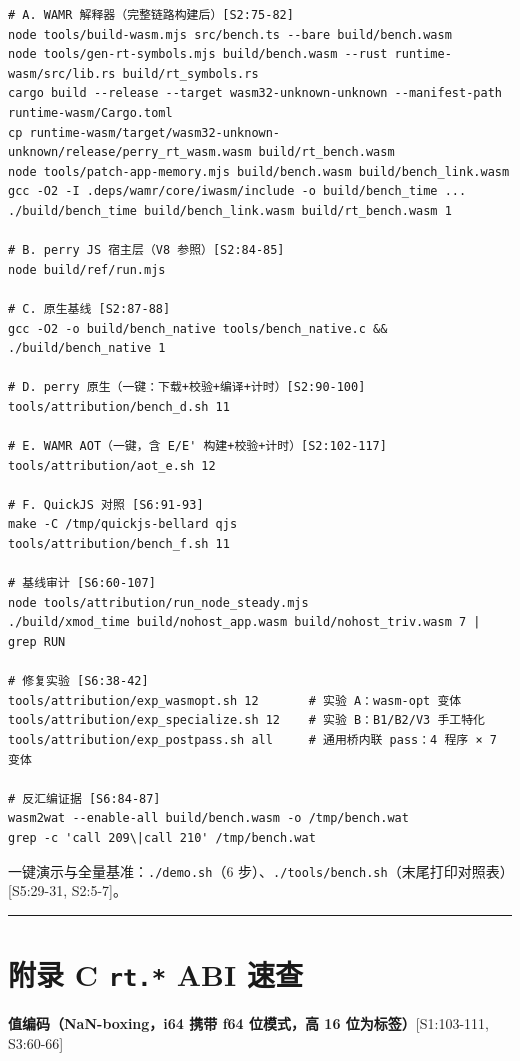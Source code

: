 \documentclass[11pt, a4paper]{article}
\begin{document}
\begin{verbatim}
# A. WAMR 解释器（完整链路构建后）[S2:75-82]
node tools/build-wasm.mjs src/bench.ts --bare build/bench.wasm
node tools/gen-rt-symbols.mjs build/bench.wasm --rust runtime-wasm/src/lib.rs build/rt_symbols.rs
cargo build --release --target wasm32-unknown-unknown --manifest-path runtime-wasm/Cargo.toml
cp runtime-wasm/target/wasm32-unknown-unknown/release/perry_rt_wasm.wasm build/rt_bench.wasm
node tools/patch-app-memory.mjs build/bench.wasm build/bench_link.wasm
gcc -O2 -I .deps/wamr/core/iwasm/include -o build/bench_time ...
./build/bench_time build/bench_link.wasm build/rt_bench.wasm 1

# B. perry JS 宿主层（V8 参照）[S2:84-85]
node build/ref/run.mjs

# C. 原生基线 [S2:87-88]
gcc -O2 -o build/bench_native tools/bench_native.c && ./build/bench_native 1

# D. perry 原生（一键：下载+校验+编译+计时）[S2:90-100]
tools/attribution/bench_d.sh 11

# E. WAMR AOT（一键，含 E/E' 构建+校验+计时）[S2:102-117]
tools/attribution/aot_e.sh 12

# F. QuickJS 对照 [S6:91-93]
make -C /tmp/quickjs-bellard qjs
tools/attribution/bench_f.sh 11

# 基线审计 [S6:60-107]
node tools/attribution/run_node_steady.mjs
./build/xmod_time build/nohost_app.wasm build/nohost_triv.wasm 7 | grep RUN

# 修复实验 [S6:38-42]
tools/attribution/exp_wasmopt.sh 12       # 实验 A：wasm-opt 变体
tools/attribution/exp_specialize.sh 12    # 实验 B：B1/B2/V3 手工特化
tools/attribution/exp_postpass.sh all     # 通用桥内联 pass：4 程序 × 7 变体

# 反汇编证据 [S6:84-87]
wasm2wat --enable-all build/bench.wasm -o /tmp/bench.wat
grep -c 'call 209\|call 210' /tmp/bench.wat
\end{verbatim}

一键演示与全量基准：\texttt{./demo.sh}（6 步）、\texttt{./tools/bench.sh}（末尾打印对照表）[S5:29-31, S2:5-7]。


\bigskip\hrule\bigskip

\section{附录 C \texttt{rt.*} ABI 速查}

\textbf{值编码（NaN-boxing，i64 携带 f64 位模式，高 16 位为标签）}[S1:103-111, S3:60-66]
\end{document}
